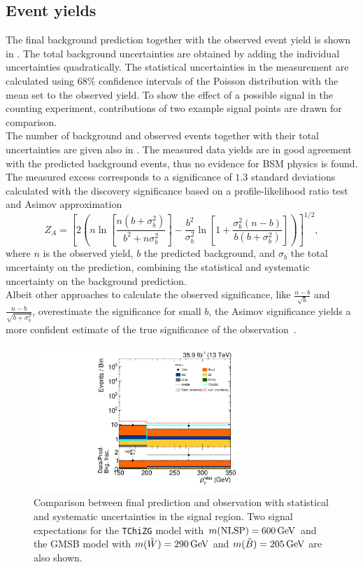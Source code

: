 \subsection*{Event yields}
The final background prediction together with the observed event yield is shown in .
The total background uncertainties are obtained by adding the individual uncertainties quadratically. The statistical uncertainties in the measurement are calculated using $68\%$ confidence intervals of the Poisson distribution with the mean set to the observed yield.
To show the effect of a possible signal in the counting experiment, contributions of two example signal points are drawn for comparison.\\
The number of background and observed events together with their total uncertainties are given also in . The measured data yields are in good agreement with the predicted background events, thus no evidence for BSM physics is found. The measured excess corresponds to a significance of $1.3$ standard deviations calculated with the discovery significance based on a profile-likelihood ratio test and Asimov approximation~\cite{Significance2}
\begin{equation}
 Z_A = \left[ 2\left( n\ln{\left[\frac{n(b+\sigma_{b}^2)}{b^2+n\sigma_{b}^2}\right]} -\frac{b^2}{\sigma_{b}^2} \ln \left[1+\frac{\sigma_b ^2 (n-b)}{b(b+\sigma_b ^2)} \right]  \right)    \right]^{1/2},
\end{equation}
where $n$ is the observed yield, $b$ the predicted background, and $\sigma_{b}$ the total uncertainty on the prediction, combining the statistical and systematic uncertainty on the background prediction.\\
Albeit other approaches to calculate the observed significance, like $\frac{n-b}{\sqrt{b}}$ and $\frac{n-b}{\sqrt{b+\sigma_b^2}}$, overestimate the significance for small $b$, the Asimov significance yields a more confident estimate of the true significance of the observation~\cite{Significance}.
\begin{figure}[bpt]
 \centering
 \includegraphics[width=0.7\textwidth]{figures/EndorsementPlots/final_MC_log}
 \caption{Comparison between final prediction and observation with statistical and systematic uncertainties in the signal region. Two signal expectations for the \texttt{TChiZG} model with $m(\text{NLSP})=600\,\text{Ge\hspace{-.08em}V}$ and the GMSB model with $m(\tilde{W})=290\,\text{Ge\hspace{-.08em}V}$ and $m(\tilde{B})=205\,\text{Ge\hspace{-.08em}V}$ are also shown.}
 \label{fig:result}
\end{figure}
